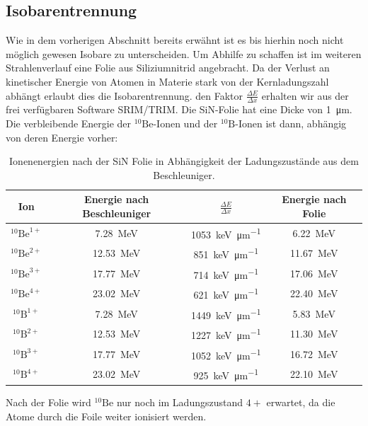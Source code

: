 \subsection{Isobarentrennung}
Wie in dem vorherigen Abschnitt bereits erwähnt ist es bis hierhin noch nicht möglich gewesen Isobare zu unterscheiden.
Um Abhilfe zu schaffen ist im weiteren Strahlenverlauf eine Folie aus Siliziumnitrid angebracht.
Da der Verlust an kinetischer Energie von Atomen in Materie stark von der Kernladungszahl abhängt erlaubt dies die Isobarentrennung.
den Faktor $\frac{\Delta E}{\Delta x}$ erhalten wir aus der frei verfügbaren Software SRIM/TRIM.
Die SiN-Folie hat eine Dicke von \SI{1}{\micro\metre}.
Die verbleibende Energie der $^{10}\text{Be}$-Ionen und der $^{10}\text{B}$-Ionen ist dann, abhängig von deren Energie vorher:
\begin{table}[H]
  \centering
  \caption{Ionenenergien nach der SiN Folie in Abhängigkeit der Ladungszustände aus dem Beschleuniger.}
  \begin{tabular}{|c|c|c|c|}
    \hline
    Ion & Energie nach Beschleuniger & $\frac{\Delta E}{\Delta x}$ & Energie nach Folie \\
    \hline
    $^{10}\text{Be}^{1+}$ & \SI{7.28}{\mega\electronvolt}  & \SI{1053}{\kilo\electronvolt\per\micro\metre} & \SI{6.22}{\mega\electronvolt} \\
    $^{10}\text{Be}^{2+}$ & \SI{12.53}{\mega\electronvolt} & \SI{851}{\kilo\electronvolt\per\micro\metre} & \SI{11.67}{\mega\electronvolt} \\
    $^{10}\text{Be}^{3+}$ & \SI{17.77}{\mega\electronvolt} & \SI{714}{\kilo\electronvolt\per\micro\metre} & \SI{17.06}{\mega\electronvolt} \\
    $^{10}\text{Be}^{4+}$ & \SI{23.02}{\mega\electronvolt} & \SI{621}{\kilo\electronvolt\per\micro\metre} & \SI{22.40}{\mega\electronvolt} \\
    \hline
    $^{10}\text{B}^{1+}$ & \SI{7.28}{\mega\electronvolt}   & \SI{1449}{\kilo\electronvolt\per\micro\metre} & \SI{5.83}{\mega\electronvolt} \\
    $^{10}\text{B}^{2+}$ & \SI{12.53}{\mega\electronvolt}  & \SI{1227}{\kilo\electronvolt\per\micro\metre} & \SI{11.30}{\mega\electronvolt} \\
    $^{10}\text{B}^{3+}$ & \SI{17.77}{\mega\electronvolt}  & \SI{1052}{\kilo\electronvolt\per\micro\metre} & \SI{16.72}{\mega\electronvolt} \\
    $^{10}\text{B}^{4+}$ & \SI{23.02}{\mega\electronvolt}  & \SI{925}{\kilo\electronvolt\per\micro\metre} & \SI{22.10}{\mega\electronvolt} \\
    \hline
  \end{tabular}
  \label{Auswertung_tab_Ionenenergien_nach_Folie}
\end{table}
Nach der Folie wird $^{10}\text{Be}$ nur noch im Ladungszustand $4+$ erwartet, da die Atome durch die Foile weiter ionisiert werden.

